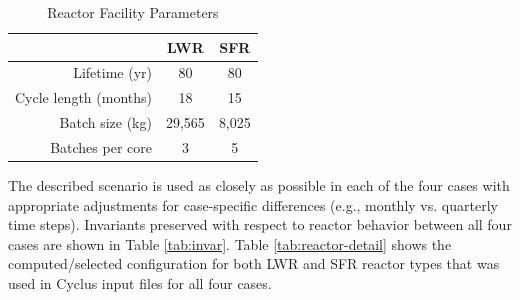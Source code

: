 \documentclass{style}
\begin{document}
\vspace{2mm}

\begin{table}[h]
    \caption{Reactor Facility Parameters}
    \centering
    \begin{tabular}{ |r | c c | }
        \hline                       
            & LWR & SFR \\
        \hline                       
        Lifetime (yr)         & 80 & 80 \\
        Cycle length (months) & 18 & 15 \\
        Batch size (kg)       & 29,565 & 8,025 \\
        Batches per core      & 3 & 5 \\
        \hline                       
    \end{tabular}
    \captionsetup{justification=centering}
    \label{tab:reactors}
\end{table}

The described scenario is used as closely as possible in each of the four
cases with appropriate adjustments for case-specific differences (e.g., monthly
vs. quarterly time steps).  Invariants preserved with respect to reactor
behavior between all four cases are shown in Table \ref{tab:invar}.  Table
\ref{tab:reactor-detail} shows the computed/selected configuration for both
LWR and SFR reactor types that was used in Cyclus input files for all four
cases.
\end{document}
